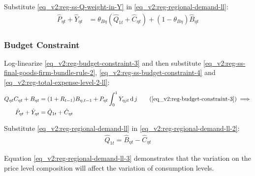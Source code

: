 \documentclass[../thesis.tex]{subfiles}
\begin{document}

Substitute \ref{eq_v2:reg-ss-Q-weight-in-Y} in \ref{eq_v2:reg-regional-demand-ll}:
\begin{align}
	\hat{P}_{\eta t} + \hat{Y}_{\eta t} &= \theta_{B\eta} (\hat{Q}_{1t} + \hat{C}_{\eta t}) + (1-\theta_{B\eta}) \hat{B}_{\eta t} \label{eq_v2:reg-regional-demand-ll-2}
\end{align}




\subsubsection*{Budget Constraint}

Log-linearize \ref{eq_v2:reg-budget-constraint-3} and then substitute \ref{eq_v2:reg-ss-final-goods-firm-bundle-rule-2}, \ref{eq_v2:reg-ss-budget-constraint-4} and \ref{eq_v2:reg-total-expense-level-2-ll}:
\begin{align}
	Q_{\eta t} C_{\eta t} + B_{\eta t} &= (1 + R_{t-1}) B_{\eta,t-1} + P_{\eta t} \int_{0}^{1} Y_{\eta jt} \dif j \tag{\ref{eq_v2:reg-budget-constraint-3}} \implies \\
	\hat{P}_{\eta t} + \hat{Y}_{\eta t} &= \hat{Q}_{1t} + \hat{C}_{\eta t} \label{eq_v2:reg-budget-constraint-4}
\end{align}


Substitute \ref{eq_v2:reg-regional-demand-ll} in \ref{eq_v2:reg-regional-demand-ll-2}:
\begin{align}
	\hat{Q}_{1t} = \hat{B}_{\eta t} - \hat{C}_{\eta t} \label{eq_v2:reg-regional-demand-ll-3}
\end{align}

Equation \ref{eq_v2:reg-regional-demand-ll-3} demonstrates that the variation on the price level composition will affect the variation of consumption levels.


\end{document}
